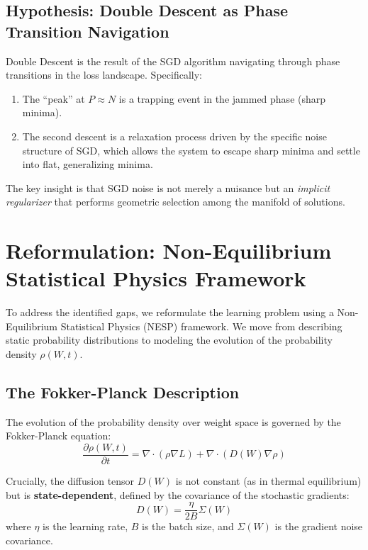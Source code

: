 \documentclass[
  journal=largetwo,
  year=2025,
  volume=37,
]{cup-journal}
\begin{document}
\subsection{Hypothesis: Double Descent as Phase Transition Navigation}

\begin{hypothesis}
Double Descent is the result of the SGD algorithm navigating through phase transitions in the loss landscape. Specifically:
\begin{enumerate}
    \item The ``peak'' at $P \approx N$ is a trapping event in the jammed phase (sharp minima).
    \item The second descent is a relaxation process driven by the specific noise structure of SGD, which allows the system to escape sharp minima and settle into flat, generalizing minima.
\end{enumerate}
\end{hypothesis}

The key insight is that SGD noise is not merely a nuisance but an \textit{implicit regularizer} that performs geometric selection among the manifold of solutions.

\section{Reformulation: Non-Equilibrium Statistical Physics Framework}

To address the identified gaps, we reformulate the learning problem using a Non-Equilibrium Statistical Physics (NESP) framework. We move from describing static probability distributions to modeling the evolution of the probability density $\rho(W,t)$.

\subsection{The Fokker-Planck Description}

The evolution of the probability density over weight space is governed by the Fokker-Planck equation:
\begin{equation}
    \frac{\partial \rho(W, t)}{\partial t} = \nabla \cdot \left(\rho \nabla L\right) + \nabla \cdot \left(D(W) \nabla \rho\right)
\end{equation}

Crucially, the diffusion tensor $D(W)$ is not constant (as in thermal equilibrium) but is \textbf{state-dependent}, defined by the covariance of the stochastic gradients:
\begin{equation}
    D(W) = \frac{\eta}{2B} \Sigma(W)
\end{equation}
where $\eta$ is the learning rate, $B$ is the batch size, and $\Sigma(W)$ is the gradient noise covariance.
\end{document}
